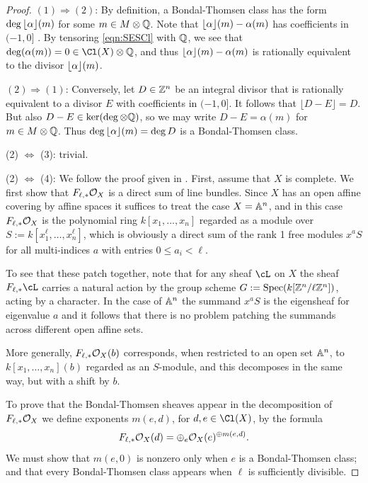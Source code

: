 \documentclass{amsart}
\begin{document}
\begin{proof}
$(1) \Rightarrow (2)$: By definition, a Bondal-Thomsen class has the form $\deg \alp(m)$ for some $m\in M\otimes \QQ$.
Note that $\alp(m) - \alpha(m)$ has coefficients in $(-1,0]$ .
By tensoring \eqref{eqn:SESCl} with $\QQ$, we see that $\deg(\alpha(m)) = 0 \in \Cl(X) \otimes \QQ$, and thus
$\alp(m) - \alpha(m)$ is rationally equivalent to the divisor  $\alp(m)$.

$(2) \Rightarrow (1)$: Conversely, let $D\in \ZZ^{n}$ be an integral divisor that is rationally equivalent to a divisor $E$ with coefficients in $(-1,0]$. It follows that $\lfloor D-E\rfloor = D$.
But also $D-E \in \ker (\deg \otimes \QQ)$, so we may write $D-E = \alpha(m)$ for $m \in M\otimes \QQ$.
Thus $\deg \alp(m) = \deg D$ is a Bondal-Thomsen class.

(2) $\iff$  (3): trivial.

(2) $\iff$ (4): We follow the proof given in \cite[Theorem 1.1]{Achinger15}. First, assume that $X$ is complete.
We first show that
$F_{\ell,*}\cO_X$ is a direct sum of line bundles. Since
 $X$ has an open
affine covering by affine spaces it suffices to treat the case $X = \AA^{n}$, and in this case
$F_{\ell,*}\cO_X$ is the polynomial ring $k[x_{1},...,x_{n}]$ regarded as a module over
$S := k[x_{1}^{\ell},\dots,x_{n}^{\ell}]$, which is obviously a direct sum of the rank 1 free modules
$x^{a}S$ for all multi-indices $a$ with entries $0\leq a_{i}<\ell$.

To see that these patch together,
note that for any sheaf $\cL$ on $X$ the sheaf $F_{\ell,*}\cL$ carries a natural action by the
group scheme $G :=\Spec(k[\ZZ^{n}/\ell \ZZ^{n}]) $, acting by a character.
In the case of $\AA^{n}$ the summand $x^{a}S$ is the eigensheaf for eigenvalue $a$ and it follows
that there is no problem patching the summands across different open affine sets.

More generally, $F_{\ell,*}\cO_X(b)$ corresponds, when restricted to an open set $\AA^{n}$,
to $k[x_{1},\dots,x_{n}](b)$ regarded as an $S$-module, and this decomposes in the same way,
but with a shift by $b$.

To prove that the Bondal-Thomsen sheaves appear in the decomposition
of $F_{\ell,*}\cO_X$
we define exponents $m(e,d)$, for $d,e\in \Cl(X)$, by the formula
$$
F_{\ell,*}\cO_X(d) = \oplus_{e} \cO_{X}(e)^{\oplus m(e,d)}.
$$
We must show that $m(e,0)$ is nonzero only when $e$ is a Bondal-Thomsen class; and that
every Bondal-Thomsen class appears when $\ell$ is sufficiently divisible.


\end{proof}
\end{document}
